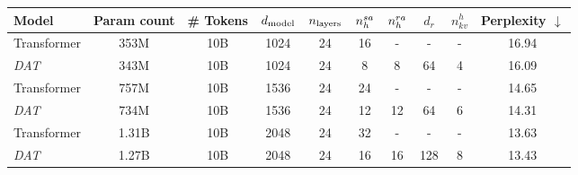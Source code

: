 \begin{tabular}{@{}lcc|cccccc|c@{}}
    \toprule
    Model        & Param count   & \# Tokens &$d_{\mathrm{model}}$&$n_{\mathrm{layers}}$& $n_h^{sa}$  & $n_h^{ra}$ & $d_r$ & $n_{kv}^{h}$ & Perplexity $\downarrow$ \\ \midrule\hline
    Transformer  & 353M   & 10B       & 1024    & 24       & 16       & -        & -     & -           & 16.94     \\
    \textit{DAT} & 343M   & 10B       & 1024    & 24       & 8        & 8        & 64    & 4           & 16.09     \\\midrule
    Transformer  & 757M   & 10B       & 1536    & 24       & 24       & -        & -     & -           & 14.65     \\
    \textit{DAT} & 734M   & 10B       & 1536    & 24       & 12       & 12       & 64     & 6          & 14.31     \\\midrule
    Transformer  & 1.31B  & 10B       & 2048    & 24       & 32       & -        & -     & -           & 13.63     \\
    \textit{DAT} & 1.27B  & 10B       & 2048    & 24       & 16       & 16       & 128   & 8           & 13.43     \\
\end{tabular}%
